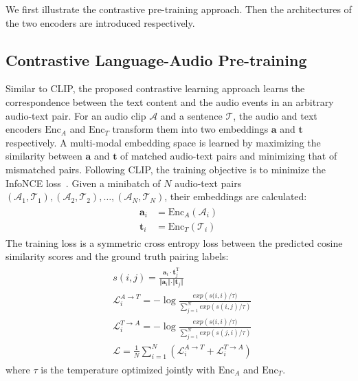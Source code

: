 \documentclass[sigconf,anonymous,review]{acmart}
\begin{document}
We first illustrate the contrastive pre-training approach.
Then the architectures of the two encoders are introduced respectively.

\subsection{Contrastive Language-Audio Pre-training}
Similar to CLIP, the proposed contrastive learning approach learns the correspondence between the text content and the audio events in an arbitrary audio-text pair.
For an audio clip $\mathcal{A}$ and a sentence $\mathcal{T}$, the audio and text encoders $\text{Enc}_A$ and $\text{Enc}_T$ transform them into two embeddings $\mathbf{a}$ and $\mathbf{t}$ respectively.
A multi-modal embedding space is learned by maximizing the similarity between $\mathbf{a}$ and $\mathbf{t}$ of matched audio-text pairs and minimizing that of mismatched pairs.
Following CLIP, the training objective is to minimize the InfoNCE loss~\cite{van2018representation}.
Given a minibatch of $N$ audio-text pairs $(\mathcal{A}_1, \mathcal{T}_1), (\mathcal{A}_2, \mathcal{T}_2),\ldots, (\mathcal{A}_N, \mathcal{T}_N)$, their embeddings are calculated:
\begin{align*}
\begin{split}
   \mathbf{a}_i &= \text{Enc}_A (\mathcal{A}_i)\\
    \mathbf{t}_i &= \text{Enc}_T (\mathcal{T}_i)
\end{split}
\end{align*}
The training loss is a symmetric cross entropy loss between the predicted cosine similarity scores and the ground truth pairing labels:
\begin{align*}
    \begin{split}
        &s(i, j) = \frac{\mathbf{a}_i\cdot\mathbf{t}_j^{\mathrm{T}}}{
        \Vert \mathbf{a}_i \Vert \cdot \Vert \mathbf{t}_j \Vert
        }\\
        &\mathcal{L}_i^{A \rightarrow T} = -\log \frac{exp\left(s(i, i\right) / \tau )}{\sum_{j=1}^N exp(s\left(i, j\right) / \tau)}\\
        &\mathcal{L}_i^{T \rightarrow A} = -\log \frac{exp\left(s(i, i\right) / \tau )}{\sum_{j=1}^N exp(s\left(j, i\right) / \tau)}\\
        &\mathcal{L} = \frac{1}{N}\sum_{i=1}^N(\mathcal{L}_i^{A \rightarrow T} + \mathcal{L}_i^{T \rightarrow A})
    \end{split}
\end{align*}
where $\tau$ is the temperature optimized jointly with $\text{Enc}_A$ and $\text{Enc}_T$.
\end{document}
